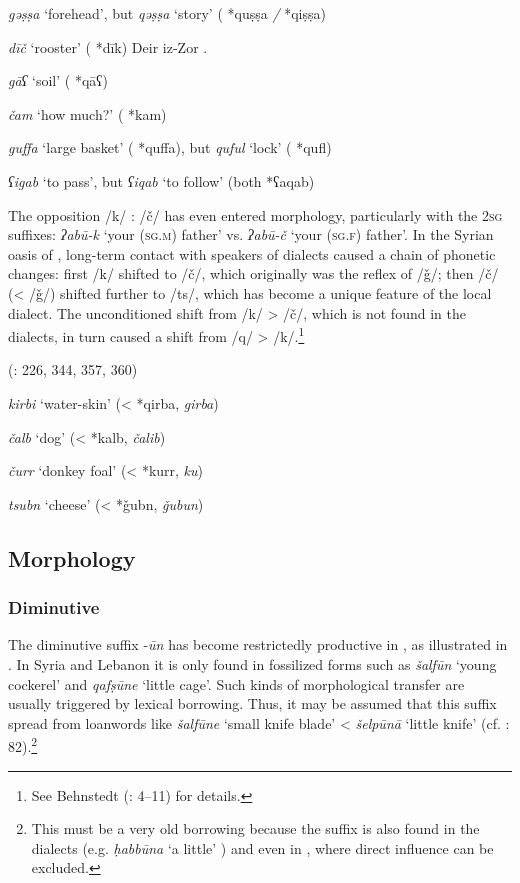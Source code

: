 \documentclass[output=paper]{langsci/langscibook}
\begin{document}
\textit{gəṣṣa} ‘forehead’, but \textit{qəṣṣa} ‘story’ ( *quṣṣa \textit{/} *qiṣṣa)

\textit{dīč} ‘rooster’  ( *dīk)
\ex \label{Deir}Deir iz-Zor \citep[42--43]{Jastrow1978}. 

\textit{gāʕ} ‘soil’ ( *qāʕ)

\textit{čam} ‘how much?’ ( *kam)
\ex \label{Baghdad} \citep[18--19]{Palva2009}

\textit{guffa} ‘large basket’ ( *quffa), but \textit{quful} ‘lock’ ( *qufl)

\textit{ʕigab} ‘to pass’, but \textit{ʕiqab} ‘to follow’ (both  *ʕaqab)
\z

The opposition /k/ : /č/ has even entered morphology, particularly with the 2\textsc{sg} suffixes: \textit{ʔabū-k} `your (\textsc{sg.m}) father' vs. \textit{ʔabū-č} ‘your (\textsc{sg.f}) father’. In the Syrian oasis of , long-term contact with speakers of  dialects caused a chain of phonetic changes: first /k/ shifted to /č/, which originally was the reflex of  /ǧ/; then /č/ (< /ǧ/) shifted further to /ts/, which has become a unique feature of the local dialect. The unconditioned shift from /k/ > /č/, which is not found in the  dialects, in turn caused a shift from /q/ > /k/.\footnote{See Behnstedt (\citeyear{Behnstedt1994Soukhne}: 4--11) for details.}

\ea
{} (\citealt{Behnstedt1994Soukhne}: 226, 344, 357, 360)

\textit{kirbi} ‘water-skin’ (<  *qirba,  \textit{girba})

\textit{čalb} ‘dog’ (<  *kalb,  \textit{čalib})

\textit{čurr} ‘donkey foal’ (<  *kurr,  \textit{ku\R\R})

\textit{tsubn} ‘cheese’ (<  *ǧubn,  \textit{ǧubun})
\z

\subsection{Morphology}
\subsubsection{Diminutive}
The  {diminutive} suffix -\textit{ūn} has become restrictedly productive in   \citep[72]{Masliyah1997}, as illustrated in . In Syria and Lebanon it is only found in fossilized forms such as \textit{šalfūn} ‘young cockerel’ and \textit{qafṣūne} ‘little cage’.  Such kinds of morphological {transfer} are usually triggered by lexical borrowing. Thus, it may be assumed that this suffix spread from {loanwords} like \textit{šalfūne} ‘small knife blade’ <  \textit{šelpūnā} ‘little knife’ (cf. \citealt{Féghali1918}: 82).\footnote{This must be a very old borrowing because the suffix is also found in the  dialects (e.g. \textit{ḥabbūna} ‘a little’ \citealt[279]{Holes2002}) and even in   \citep[496]{Singer1984}, where direct  influence can be excluded.}
\end{document}
